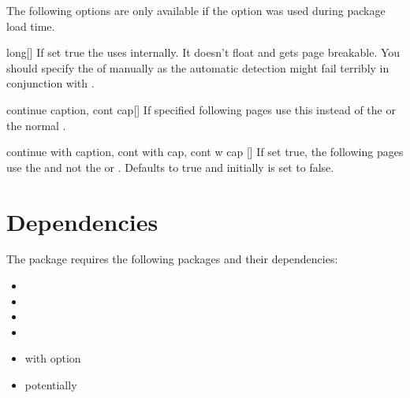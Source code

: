 The following options are only available if the  option was used
during package load time.

\begin{describeopt}{long}[]%
  If set true the  uses  internally. It doesn't
  float and gets page breakable. You should specify the  of
   manually as the automatic detection might fail terribly in
  conjunction with .
\end{describeopt}%
\begin{describeopt}{continue caption, cont cap}[]%
  If specified following pages use this  instead of the  or the normal .
\end{describeopt}%
\begin{describeopt}{continue with caption, cont with cap, cont w cap}%
  []
  If set true, the following pages use the  and not the  or . Defaults to true and initially is set to
  false.
\end{describeopt}%

\section{Dependencies}%
The package requires the following packages and their dependencies:
\vspace*{-\multicolsep}%
\begin{multicols}{3}
  \begin{itemize}
    \item {}
    \item {}
    \item {}
    \item {}
    \item {} with option 
    \item potentially 
  \end{itemize}
\end{multicols}
\vspace*{-\multicolsep}%

